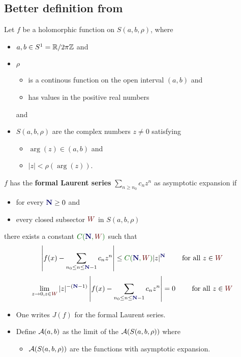 \subsection{Better definition from \cite{van2003galois}}
Let $f$ be a holomorphic function on $S(a,b,\rho)$, where
\begin{itemize}
  \item $a,b\in S^1=\mathbb{R}/2\pi\mathbb{Z}$ and
  \item $\rho$
    \begin{itemize}
      \item is a continous function on the open interval $(a,b)$ and
      \item has values in the positive real numbers
    \end{itemize}
    and
  \item $S(a,b,\rho)$ are the complex numbers $z\neq0$ satisfying
    \begin{itemize}
      \item $\arg(z)\in(a,b)$ and
      \item $|z|<\rho(\arg(z))$.
    \end{itemize}
\end{itemize}
\begin{defn}[7.1]
  \def\myN{\textbf{\textcolor{blue!40!black}{N}}}
  \def\mySect{\textcolor{red!40!black}{W}}
  \def\myConst{\textcolor{green!40!black}{C(\myN,\mySect)}}
  $f$ has the \textbf{formal Laurent series} $\sum_{n\geq n_0}c_nz^n$ as
  asymptotic expansion if
  \begin{itemize}
    \item for every $\myN\geq0$ and
    \item every closed subsector $\mySect$ in $S(a,b,\rho)$
  \end{itemize}
  there exists a constant $\myConst$ such that
  \[
    \left|
      f(x)-\sum_{n_0\leq n\leq \myN-1}c_nz^n
    \right|
    \leq \myConst|z|^{\myN} \qquad \text{ for all } z\in \mySect
  \]
  \Leftrightarrow{}
  \[
    \lim_{z\to0,z\in{\mySect}}
    |z|^{-(\myN-1)}
    \left|
      f(x)-\sum_{n_0\leq n\leq \myN-1}c_nz^n
    \right|=0
    \qquad \text{ for all } z\in \mySect
  \]
\end{defn}
\begin{itemize}
  \item One writes $J(f)$ for the formal Laurent series.
  \item Define $\mathcal{A}(a,b)$ as the limit of the $\mathcal{A}(S(a,b,\rho))$ where
    \begin{itemize}
      \item $\mathcal{A}(S(a,b,\rho))$ are the functions with asymptotic expansion.
    \end{itemize}
\end{itemize}

